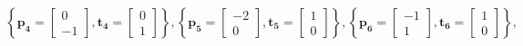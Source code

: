 \documentclass[12pt, titlepage]{article}
\begin{document}
\[ \left\lbrace \boldsymbol{p_4} = \left[\begin{array}{c} 0\\ -1\end{array}\right], \boldsymbol{t_4} = \left[\begin{array}{c} 0\\ 1\end{array}\right]  \right\rbrace, \left\lbrace \boldsymbol{p_5} = \left[\begin{array}{c} -2\\ 0\end{array}\right],\boldsymbol{t_5} = \left[\begin{array}{c} 1\\ 0\end{array}\right]  \right\rbrace, \left\lbrace \boldsymbol{p_6} = \left[\begin{array}{c} -1\\ 1\end{array}\right], \boldsymbol{t_6} = \left[\begin{array}{c} 1\\ 0\end{array}\right]  \right\rbrace,\]
\end{document}

